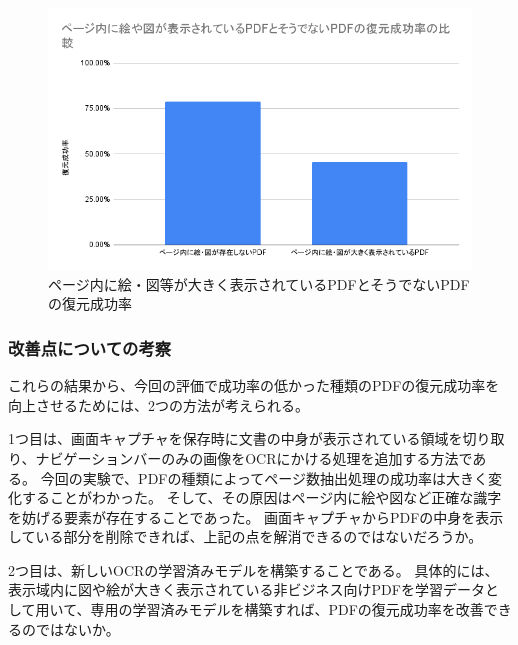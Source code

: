 \begin{figure}[htbp]
  \label{fig:success-rate-figure-or-not-pdf}
  \begin{center}
    \includegraphics[bb=0 0 702 434,width=15cm]{img/060_evaluation/consideration/pdf/success-rate-figure-or-not-pdf.pdf}
  \end{center}
  \caption{ページ内に絵・図等が大きく表示されているPDFとそうでないPDFの復元成功率}
\end{figure}

\subsubsection{改善点についての考察}
これらの結果から、今回の評価で成功率の低かった種類のPDFの復元成功率を向上させるためには、2つの方法が考えられる。

1つ目は、画面キャプチャを保存時に文書の中身が表示されている領域を切り取り、ナビゲーションバーのみの画像をOCRにかける処理を追加する方法である。
今回の実験で、PDFの種類によってページ数抽出処理の成功率は大きく変化することがわかった。
そして、その原因はページ内に絵や図など正確な識字を妨げる要素が存在することであった。
画面キャプチャからPDFの中身を表示している部分を削除できれば、上記の点を解消できるのではないだろうか。

2つ目は、新しいOCRの学習済みモデルを構築することである。
具体的には、表示域内に図や絵が大きく表示されている非ビジネス向けPDFを学習データとして用いて、専用の学習済みモデルを構築すれば、PDFの復元成功率を改善できるのではないか。
